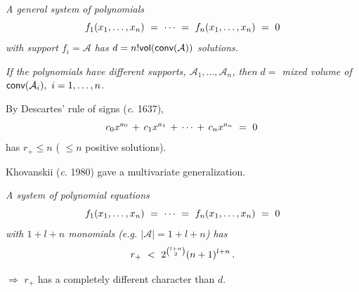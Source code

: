 \documentclass[17pt,landscape]{Narrow}
\newcommand{\conv}{\mbox{\sf conv}}
\newcommand{\vol}{\mbox{\sf vol}}
\newcommand{\calA}{{\mathcal A}}
\begin{document}
\begin{flushleft}
\noindent{}
{\sl 
 A general system of polynomials\vspace{-8pt}
\[
   f_1(x_1,\dotsc,x_n)\ =\ \dotsb\ =\ f_n(x_1,\dotsc,x_n)\ =\ 0\vspace{-8pt}
\]
with support $f_i=\calA$ has 
$d=n!\vol(\conv(\calA))$ solutions.
}

\noindent{}
{\sl 
If the polynomials have different supports,  $\calA_1,\dotsc,\calA_n$,
then $d=$ mixed volume of $\conv(\calA_i),\ i=1,\dotsc,n$.
}


\slide{}
\LogoOn
\begin{center}
\end{center}

By Descartes' rule of signs ({\sl c}. 1637),\vspace{-8pt}
\[
  c_0x^{a_0} \,+\,c_1x^{a_1}\,+\,\dotsb\,+\,c_nx^{a_n}\ =\ 0\,\vspace{-8pt}
\]
has $r_+\leq n$ ( $\leq n$ positive solutions).

Khovanskii ({\sl c}. 1980) gave a multivariate generalization.\vspace{-5pt}

\noindent{}
{\sl
 A system of polynomial equations\vspace{-8pt}
\[
   f_1(x_1,\dotsc,x_n)\ =\ \dotsb\ =\ f_n(x_1,\dotsc,x_n)\ =\ 0\vspace{-8pt}
\]
 with $1+l+n$ monomials (e.g. $|\calA|=1+l+n$) has\vspace{-8pt}
\[
   r_+\ <\ 
   2^{\binom{l+n}{2}}(n+1)^{l+n}\,.\vspace{-25pt}
\]
}

\noindent
$\Rightarrow$ $r_+$ has a completely different character than $d$.



\slide{}
\LogoOn
\begin{center}
\end{center}


\end{flushleft}
\end{document}
